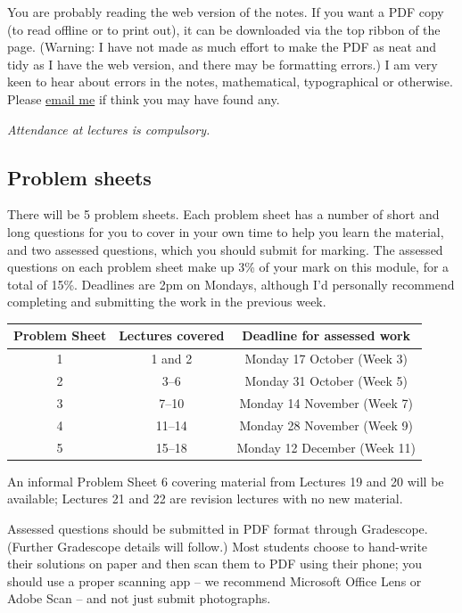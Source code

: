 \documentclass[
  a4paper,
]{book}
\theoremstyle{definition}
\theoremstyle{definition}
\theoremstyle{definition}
\theoremstyle{definition}
\theoremstyle{remark}
\begin{document}
You are probably reading the web version of the notes. If you want a PDF copy (to read offline or to print out), it can be downloaded via the top ribbon of the page. (Warning: I have not made as much effort to make the PDF as neat and tidy as I have the web version, and there may be formatting errors.) I am very keen to hear about errors in the notes, mathematical, typographical or otherwise. Please \href{mailto:m.aldridge@leeds.ac.uk}{email me} if think you may have found any.

\emph{Attendance at lectures is compulsory.}

\hypertarget{problem-sheets}{%
\subsection*{Problem sheets}\label{problem-sheets}}

There will be 5 problem sheets. Each problem sheet has a number of short and long questions for you to cover in your own time to help you learn the material, and two assessed questions, which you should submit for marking. The assessed questions on each problem sheet make up 3\% of your mark on this module, for a total of 15\%. Deadlines are 2pm on Mondays, although I'd personally recommend completing and submitting the work in the previous week.

\begin{longtable}[]{@{}ccc@{}}
\toprule()
Problem Sheet & Lectures covered & Deadline for assessed work \\
\midrule()
\endhead
1 & 1 and 2 & Monday 17 October (Week 3) \\
2 & 3--6 & Monday 31 October (Week 5) \\
3 & 7--10 & Monday 14 November (Week 7) \\
4 & 11--14 & Monday 28 November (Week 9) \\
5 & 15--18 & Monday 12 December (Week 11) \\
\bottomrule()
\end{longtable}

An informal Problem Sheet 6 covering material from Lectures 19 and 20 will be available; Lectures 21 and 22 are revision lectures with no new material.

Assessed questions should be submitted in PDF format through Gradescope. (Further Gradescope details will follow.) Most students choose to hand-write their solutions on paper and then scan them to PDF using their phone; you should use a proper scanning app -- we recommend Microsoft Office Lens or Adobe Scan -- and not just submit photographs.
\end{document}
